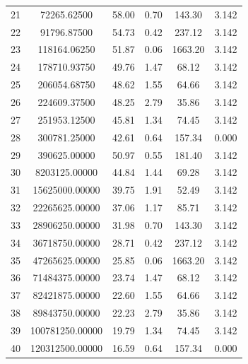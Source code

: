 \documentclass[11pt,twocolumn]{article}
\begin{document}
\begin{table}[t]
\begin{tabular}{ccrccc}
  21 & 72265.62500 & 58.00 & 0.70 & 143.30 & 3.142 \\
  22 & 91796.87500 & 54.73 & 0.42 & 237.12 & 3.142 \\
  23 & 118164.06250 & 51.87 & 0.06 & 1663.20 & 3.142 \\
  24 & 178710.93750 & 49.76 & 1.47 & 68.12 & 3.142 \\
  25 & 206054.68750 & 48.62 & 1.55 & 64.66 & 3.142 \\
  26 & 224609.37500 & 48.25 & 2.79 & 35.86 & 3.142 \\
  27 & 251953.12500 & 45.81 & 1.34 & 74.45 & 3.142 \\
  28 & 300781.25000 & 42.61 & 0.64 & 157.34 & 0.000 \\
  29 & 390625.00000 & 50.97 & 0.55 & 181.40 & 3.142 \\
  30 & 8203125.00000 & 44.84 & 1.44 & 69.28 & 3.142 \\
  31 & 15625000.00000 & 39.75 & 1.91 & 52.49 & 3.142 \\
  32 & 22265625.00000 & 37.06 & 1.17 & 85.71 & 3.142 \\
  33 & 28906250.00000 & 31.98 & 0.70 & 143.30 & 3.142 \\
  34 & 36718750.00000 & 28.71 & 0.42 & 237.12 & 3.142 \\
  35 & 47265625.00000 & 25.85 & 0.06 & 1663.20 & 3.142 \\
  36 & 71484375.00000 & 23.74 & 1.47 & 68.12 & 3.142 \\
  37 & 82421875.00000 & 22.60 & 1.55 & 64.66 & 3.142 \\
  38 & 89843750.00000 & 22.23 & 2.79 & 35.86 & 3.142 \\
  39 & 100781250.00000 & 19.79 & 1.34 & 74.45 & 3.142 \\
  40 & 120312500.00000 & 16.59 & 0.64 & 157.34 & 0.000 \\
\bottomrule
\end{tabular}
\end{table}
\end{document}
